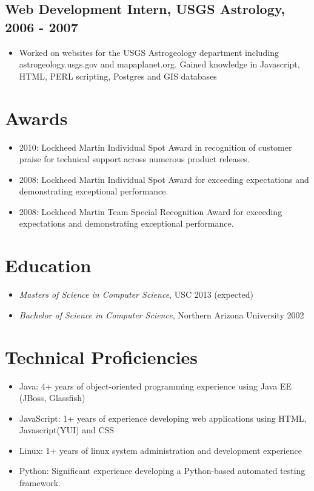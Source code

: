 \documentclass[11pt]{article}
\begin{document}
\subsection*{Web Development Intern, USGS Astrology, 2006 - 2007}
\label{sec-1.2}

\begin{itemize}
\item Worked on websites for the USGS Astrogeology department including astrogeology.usgs.gov and mapaplanet.org. Gained knowledge in Javascript, HTML, PERL scripting, Postgres and GIS databases
\end{itemize}
\section*{Awards}
\label{sec-2}

\begin{itemize}
\item 2010: Lockheed Martin Individual Spot Award in recognition of customer praise for technical support across numerous product releases.
\item 2008: Lockheed Martin Individual Spot Award for exceeding expectations and demonstrating exceptional performance.
\item 2008: Lockheed Martin Team Special Recognition Award for exceeding expectations and demonstrating exceptional performance.
\end{itemize}
\section*{Education}
\label{sec-3}

\begin{itemize}
\item \emph{Masters of Science in Computer Science}, USC 2013 (expected)
\item \emph{Bachelor of Science in Computer Science}, Northern Arizona University 2002
\end{itemize}
\section*{Technical Proficiencies}
\label{sec-4}

\begin{itemize}
\item Java: 4+ years of object-oriented programming experience using Java EE (JBoss, Glassfish)
\item JavaScript: 1+ years of experience developing web applications using HTML, Javascript(YUI) and CSS
\item Linux: 1+ years of linux system administration and development experience
\item Python: Significant experience developing a Python-based automated testing framework.
\end{itemize}
\end{document}
